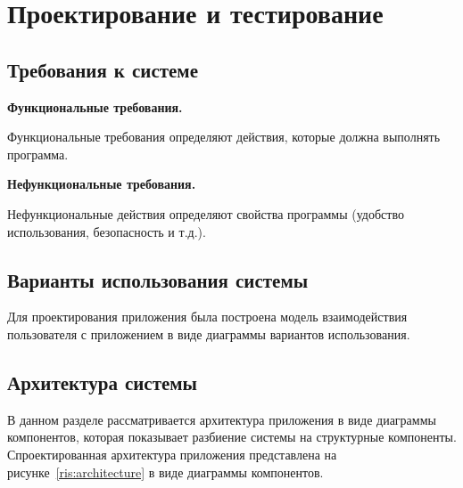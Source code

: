 \lstset{language=C, frame=L, basicstyle=\footnotesize,%
	keywordstyle=\bfseries, showstringspaces=false, xleftmargin=\parindent, numbers=none, numberstyle=\tiny, stepnumber=2, numbersep=14pt}
\newpage
\section{Проектирование и тестирование}
\label{sec:Design}

\subsection{Требования к системе}
\label{sec:Requirements}
\textbf{Функциональные требования.}

Функциональные требования определяют действия, которые должна выполнять программа.

 \begin{itemizecustom}
 \item 
 
\fxnote{}
 \end{itemizecustom}

\textbf{Нефункциональные требования.}

Нефункциональные действия определяют свойства программы (удобство использования, безопасность и т.д.).

 \begin{itemizecustom}
 \item 
 
\fxnote{}
 \end{itemizecustom}

\subsection{Варианты использования системы}
\label{sec:Using}

Для проектирования приложения была построена модель взаимодействия пользователя с приложением в виде диаграммы вариантов использования. \fxnote{}

\subsection{Архитектура системы}
\label{sec:Architecture}

В данном разделе рассматривается архитектура приложения в виде диаграммы компонентов, которая показывает разбиение системы на структурные компоненты. Спроектированная архитектура приложения представлена на рисунке~\ref{ris:architecture} в виде диаграммы компонентов.

